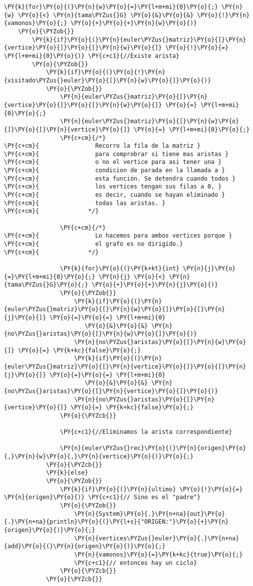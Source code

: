\begin{Verbatim}[commandchars=\\\{\}]
    \PY{k}{for}\PY{o}{(}\PY{n}{w}\PY{o}{=}\PY{l+m+mi}{0}\PY{o}{;} \PY{n}{w} \PY{o}{<} \PY{n}{tama\PYZus{}G} \PY{o}{&}\PY{o}{&} \PY{o}{!}\PY{n}{vamonos}\PY{o}{;} \PY{o}{+}\PY{o}{+}\PY{n}{w}\PY{o}{)}
	\PY{o}{\PYZob{}}
	    \PY{k}{if}\PY{o}{(}\PY{n}{euler\PYZus{}matriz}\PY{o}{[}\PY{n}{vertice}\PY{o}{]}\PY{o}{[}\PY{n}{w}\PY{o}{]} \PY{o}{!}\PY{o}{=} \PY{l+m+mi}{0}\PY{o}{)} \PY{c+c1}{//Existe arista}
		\PY{o}{\PYZob{}}
		    \PY{k}{if}\PY{o}{(}\PY{o}{!}\PY{n}{visitado\PYZus{}euler}\PY{o}{[}\PY{n}{w}\PY{o}{]}\PY{o}{)}
			\PY{o}{\PYZob{}}
			    \PY{n}{euler\PYZus{}matriz}\PY{o}{[}\PY{n}{vertice}\PY{o}{]}\PY{o}{[}\PY{n}{w}\PY{o}{]} \PY{o}{=} \PY{l+m+mi}{0}\PY{o}{;}
			    \PY{n}{euler\PYZus{}matriz}\PY{o}{[}\PY{n}{w}\PY{o}{]}\PY{o}{[}\PY{n}{vertice}\PY{o}{]} \PY{o}{=} \PY{l+m+mi}{0}\PY{o}{;}
			    \PY{c+cm}{/*}
\PY{c+cm}{			      Recorro la fila de la matriz }
\PY{c+cm}{			      para comprobrar si tiene mas aristas }
\PY{c+cm}{			      o no el vertice para asi tener una }
\PY{c+cm}{			      condicion de parada en la llamada a }
\PY{c+cm}{			      esta función. Se detendra cuando todos }
\PY{c+cm}{			      los vertices tengan sus filas a 0, }
\PY{c+cm}{			      es decir, cuando se hayan eliminado }
\PY{c+cm}{			      todas las aristas. }
\PY{c+cm}{			    */}

			    \PY{c+cm}{/*}
\PY{c+cm}{			      Lo hacemos para ambos vertices porque }
\PY{c+cm}{			      el grafo es no dirigido.}
\PY{c+cm}{			    */}

			    \PY{k}{for}\PY{o}{(}\PY{k+kt}{int} \PY{n}{j}\PY{o}{=}\PY{l+m+mi}{0}\PY{o}{;} \PY{n}{j} \PY{o}{<} \PY{n}{tama\PYZus{}G}\PY{o}{;} \PY{o}{+}\PY{o}{+}\PY{n}{j}\PY{o}{)}
				\PY{o}{\PYZob{}}
				    \PY{k}{if}\PY{o}{(}\PY{n}{euler\PYZus{}matriz}\PY{o}{[}\PY{n}{w}\PY{o}{]}\PY{o}{[}\PY{n}{j}\PY{o}{]} \PY{o}{=}\PY{o}{=} \PY{l+m+mi}{0} 
				       \PY{o}{&}\PY{o}{&} \PY{n}{no\PYZus{}aristas}\PY{o}{[}\PY{n}{w}\PY{o}{]}\PY{o}{)}
					\PY{n}{no\PYZus{}aristas}\PY{o}{[}\PY{n}{w}\PY{o}{]} \PY{o}{=} \PY{k+kc}{false}\PY{o}{;}
				    \PY{k}{if}\PY{o}{(}\PY{n}{euler\PYZus{}matriz}\PY{o}{[}\PY{n}{vertice}\PY{o}{]}\PY{o}{[}\PY{n}{j}\PY{o}{]} \PY{o}{=}\PY{o}{=} \PY{l+m+mi}{0} 
				       \PY{o}{&}\PY{o}{&} \PY{n}{no\PYZus{}aristas}\PY{o}{[}\PY{n}{vertice}\PY{o}{]}\PY{o}{)}
					\PY{n}{no\PYZus{}aristas}\PY{o}{[}\PY{n}{vertice}\PY{o}{]} \PY{o}{=} \PY{k+kc}{false}\PY{o}{;}    
				\PY{o}{\PYZcb{}}
				
			    \PY{c+c1}{//Eliminamos la arista correspondiente}

			    \PY{n}{euler\PYZus{}rec}\PY{o}{(}\PY{n}{origen}\PY{o}{,}\PY{n}{w}\PY{o}{,}\PY{n}{vertice}\PY{o}{)}\PY{o}{;}
			\PY{o}{\PYZcb{}}
		    \PY{k}{else}
			\PY{o}{\PYZob{}}
			    \PY{k}{if}\PY{o}{(}\PY{n}{ultimo} \PY{o}{!}\PY{o}{=} \PY{n}{origen}\PY{o}{)} \PY{c+c1}{// Sino es el "padre"}
				\PY{o}{\PYZob{}}
				    \PY{n}{System}\PY{o}{.}\PY{n+na}{out}\PY{o}{.}\PY{n+na}{println}\PY{o}{(}\PY{l+s}{"ORIGEN:"}\PY{o}{+}\PY{n}{origen}\PY{o}{)}\PY{o}{;}
				    \PY{n}{vertices\PYZus{}euler}\PY{o}{.}\PY{n+na}{add}\PY{o}{(}\PY{n}{origen}\PY{o}{)}\PY{o}{;}
				    \PY{n}{vamonos}\PY{o}{=}\PY{k+kc}{true}\PY{o}{;}
				    \PY{c+c1}{// entonces hay un ciclo}
				\PY{o}{\PYZcb{}}
			\PY{o}{\PYZcb{}}
			

\end{Verbatim}

